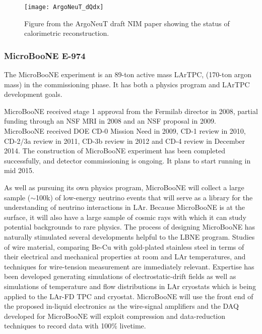 \begin{figure}
\centering 
\texttt{[image: ArgoNeuT\_dQdx]}
\caption[ArgoNeuT: status of calorimetric reconstruction]{Figure from the ArgoNeuT draft NIM paper showing the status of calorimetric reconstruction. } %
\label{ArgoNeuT-calorimetry}
\end{figure}

\subsubsection {MicroBooNE E-974}

The MicroBooNE experiment is an 89-ton active mass LArTPC, (170-ton argon mass) in the commissioning phase.  It has both a physics program and LArTPC development goals.  

MicroBooNE received stage 1 approval from the Fermilab director in 2008, partial funding through an NSF MRI in 2008 and an NSF proposal in 2009.  MicroBooNE received DOE CD-0 Mission Need in 2009, CD-1 review in 2010, CD-2/3a review in 2011, CD-3b review in 2012 and CD-4 review in December 2014. The construction of MicroBooNE experiment has been completed successfully, and detector commissioning is ongoing. It plans to start running in mid 2015. 

As well as pursuing its own physics program, MicroBooNE will collect a large sample ($\sim$100k) of low-energy neutrino events that will serve as a library for the understanding of neutrino interactions in 
LAr. Because MicroBooNE is at the surface, it will also have a large sample of cosmic rays with which it can study potential backgrounds to rare physics. The process of designing MicroBooNE has naturally stimulated several developments helpful to the LBNE program.  Studies of wire material, comparing Be-Cu with gold-plated stainless steel in terms of their electrical and mechanical properties at room and LAr temperatures, and techniques for wire-tension measurement are immediately relevant. Expertise has been developed generating simulations of electrostatic-drift fields as well as simulations of temperature and flow distributions in LAr cryostats which is being applied to the LAr-FD TPC and cryostat. MicroBooNE will use the front end of the proposed in-liquid electronics as the wire-signal amplifiers and the DAQ developed for MicroBooNE will exploit compression and data-reduction techniques to record data with 100\% livetime.

